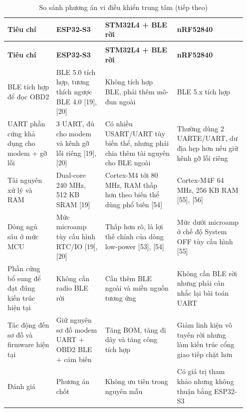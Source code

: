 \documentclass[a4paper]{extarticle}
\newcommand{\thesissettableid}[2]{%
  \renewcommand{\thetable}{#1}%
  \renewcommand{\theHtable}{#2}%
}
\begin{document}
{\thesissettableid{3.3}{condensed-bang-3-3-so-sanh-phuong-an-vi-dieu-khien-trung-tam}
\def\LTcaptype{table}
\begin{longtable}{|L{0.196\linewidth}|L{0.196\linewidth}|L{0.289\linewidth}|L{0.27\linewidth}|}
\caption{So sánh phương án vi điều khiển trung tâm}\label{tab:condensed-bang-3-3-so-sanh-phuong-an-vi-dieu-khien-trung-tam}\\
\hline
\textbf{Tiêu chí} & \textbf{ESP32-S3} & \textbf{STM32L4 + BLE rời} & \textbf{nRF52840} \\
\hline
\endfirsthead
\caption[]{So sánh phương án vi điều khiển trung tâm (tiếp theo)}\\
\hline
\textbf{Tiêu chí} & \textbf{ESP32-S3} & \textbf{STM32L4 + BLE rời} & \textbf{nRF52840} \\
\hline
\endhead
\endfoot
\endlastfoot
BLE tích hợp để đọc OBD2 & BLE 5.0 tích hợp, tương thích ngược BLE 4.0 {[}19{]}, {[}20{]} & Không tích hợp BLE, phải thêm mô-đun ngoài & BLE 5.x tích hợp \\\hline
UART phần cứng khả dụng cho modem + gỡ lỗi & 3 UART, đủ cho modem và kênh gỡ lỗi riêng {[}19{]}, {[}20{]} & Có nhiều USART/UART tùy biến thể, nhưng phải chia thêm tài nguyên cho BLE ngoài & Thường dùng 2 UARTE/UART, dư địa hẹp hơn nếu giữ kênh gỡ lỗi riêng \\\hline
Tài nguyên xử lý và RAM & Dual-core 240 MHz, 512 KB SRAM {[}19{]} & Cortex-M4 tới 80 MHz, RAM thấp hơn theo biến thể dùng phổ biến {[}54{]} & Cortex-M4F 64 MHz, 256 KB RAM {[}55{]}, {[}56{]} \\\hline
Dòng ngủ sâu ở mức MCU & Mức microamp tùy cấu hình RTC/IO {[}19{]}, {[}20{]} & Thấp hơn rõ, là lợi thế chính của dòng low-power {[}53{]}, {[}54{]} & Mức dưới microamp ở chế độ System OFF tùy cấu hình {[}55{]} \\\hline
Phần cứng bổ sung để đạt đúng kiến trúc hiện tại & Không cần radio BLE rời & Cần thêm BLE ngoài và miền nguồn tương ứng & Không cần BLE rời nhưng phải cân nhắc lại bài toán UART \\\hline
Tác động đến sơ đồ và firmware hiện tại & Giữ nguyên sơ đồ modem UART + OBD2 BLE + cảm biến & Tăng BOM, tăng đi dây và tăng công tích hợp & Giảm linh kiện vô tuyến rời nhưng làm kiến trúc cổng giao tiếp chặt hơn \\\hline
Đánh giá & Phương án chốt & Không ưu tiên trong nguyên mẫu & Có giá trị tham khảo nhưng không thuận bằng ESP32-S3 \\\hline
\end{longtable}
}
\end{document}
